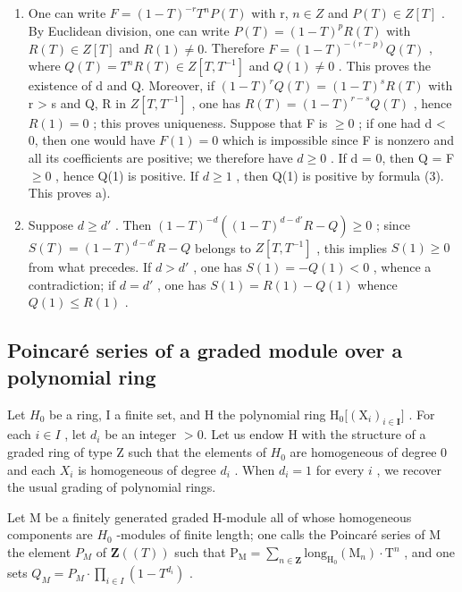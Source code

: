 \begin{enumerate}
\def\labelenumi{\alph{enumi})}
\item
  One can write \(F = (1 - T)^{-r} T^{n} P(T)\) with r, \(n \in Z\) and \(P(T) \in Z[T]\) . By Euclidean division, one can write \(P(T) = (1 - T)^{p} R(T)\) with \(R(T) \in Z[T]\) and \(R(1) \neq 0\). Therefore \(F = (1 - T)^{-(r-p)} Q(T)\) , where \(Q(T) = T^{n} R(T) \in Z[T, T^{-1}]\) and \(Q(1) \neq 0\) . This proves the existence of d and Q. Moreover, if \((1 - T)^{r} Q(T) = (1 - T)^{s} R(T)\) with r \textgreater{} s and Q, R in \(Z[T, T^{-1}]\) , one has \(R(T) = (1 - T)^{r-s} Q(T)\) , hence \(R(1) = 0\) ; this proves uniqueness. Suppose that F is \(\geqslant 0\) ; if one had d \textless{} 0, then one would have \(F(1) = 0\) which is impossible since F is nonzero and all its coefficients are positive; we therefore have \(d \geqslant 0\) . If d = 0, then Q = F \(\geqslant 0\) , hence Q(1) is positive. If \(d \geqslant 1\) , then Q(1) is positive by formula (3). This proves a).
\item
  Suppose \(d \geqslant d'\) . Then \((1 - T)^{-d}((1 - T)^{d - d'} R - Q) \geqslant 0\) ; since \(S(T) = (1 - T)^{d - d'} R - Q\) belongs to \(Z[T, T^{-1}]\) , this implies \(S(1) \geqslant 0\) from what precedes. If \(d > d'\) , one has \(S(1) = -Q(1) < 0\) , whence a contradiction; if \(d = d'\) , one has \(S(1) = R(1) - Q(1)\) whence \(Q(1) \leqslant R(1)\) .
\end{enumerate}

\subsection{Poincaré series of a graded module over a polynomial ring}

Let \(H_{0}\) be a ring, I a finite set, and H the polynomial ring \(\mathrm{H}_{0}\big[(\mathrm{X}_{i})_{i\in\mathbf{I}}\big]\) . For each \(i\in I\) , let \(d_{i}\) be an integer \(>0\). Let us endow H with the structure of a graded ring of type Z such that the elements of \(H_{0}\) are homogeneous of degree 0 and each \(X_{i}\) is homogeneous of degree \(d_{i}\) . When \(d_{i}=1\) for every \(i\) , we recover the usual grading of polynomial rings.

Let M be a finitely generated graded H-module all of whose homogeneous components are \(H_{0}\) -modules of finite length; one calls the Poincaré series of M the element \(P_{M}\) of \(\mathbf{Z}((T))\) such that \(\mathrm{P}_{\mathrm{M}} = \sum_{n \in \mathbf{Z}} \mathrm{long}_{\mathrm{H}_{0}}(\mathrm{M}_{n}) \cdot \mathrm{T}^{n}\) , and one sets \(Q_{M} = P_{M} \cdot \prod_{i \in I} (1 - T^{d_{i}})\) .

